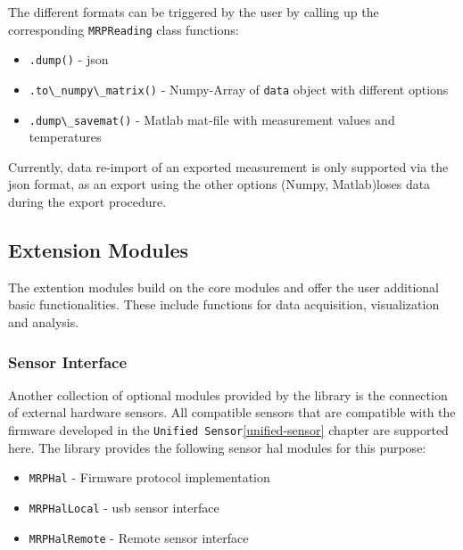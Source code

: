 The different formats can be triggered by the user by calling up the
corresponding \passthrough{\lstinline!MRPReading!} class functions:

\begin{itemize}
\tightlist
\item
  \passthrough{\lstinline!.dump()!} - \gls{json}
\item
  \passthrough{\lstinline!.to\_numpy\_matrix()!} - Numpy-Array of
  \passthrough{\lstinline!data!} object with different options
\item
  \passthrough{\lstinline!.dump\_savemat()!} - Matlab mat-file with
  measurement values and temperatures
\end{itemize}

Currently, data re-import of an exported measurement is only supported
via the \gls{json} format, as an export using the other options (Numpy,
Matlab)loses data during the export procedure.

\hypertarget{extension-modules}{%
\subsection{Extension Modules}\label{extension-modules}}

The extention modules build on the core modules and offer the user
additional basic functionalities. These include functions for data
acquisition, visualization and analysis.

\hypertarget{sensor-interface}{%
\subsubsection{Sensor Interface}\label{sensor-interface}}

Another collection of optional modules provided by the library is the
connection of external hardware sensors. All compatible sensors that are
compatible with the firmware developed in the
\passthrough{\lstinline!Unified Sensor!}\ref{unified-sensor} chapter are
supported here. The library provides the following sensor \gls{hal}
modules for this purpose:

\begin{itemize}
\tightlist
\item
  \passthrough{\lstinline!MRPHal!} - Firmware protocol implementation
\item
  \passthrough{\lstinline!MRPHalLocal!} - \gls{usb} sensor interface
\item
  \passthrough{\lstinline!MRPHalRemote!} - Remote sensor interface
\end{itemize}

